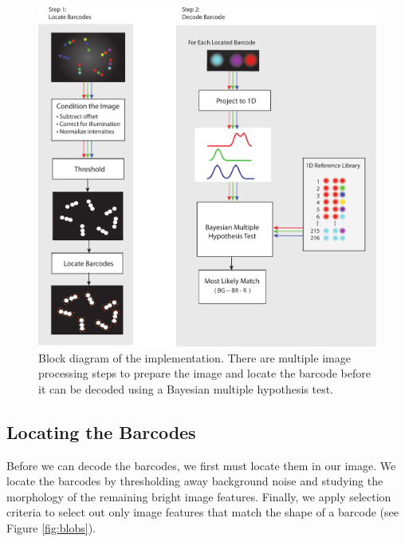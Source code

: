 \begin{figure}
\begin{center}
	\includegraphics[width=\textwidth]{figures/theoryBlockDiagram}
	\caption{Block diagram of the implementation. There are multiple image processing steps to prepare the image and locate the barcode before it can be decoded using a Bayesian multiple hypothesis test. \label{fig:theoryBlockDiagram}}
\end{center}
\end{figure}



\subsection{Locating the Barcodes} \label{sec:locatingBarcodes}
Before we can decode the barcodes, we first must locate them in our image. We locate the barcodes by thresholding away background noise and studying the morphology of the remaining bright image features. Finally, we apply selection criteria to select out only image features that match the shape of a barcode (see Figure \ref{fig:blobs}). 

